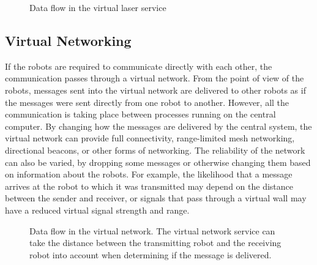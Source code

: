 \documentclass[]{article}
\begin{document}
\begin{figure}
	\centering
	\caption{Data flow in the virtual laser service}
\end{figure}

\subsection{Virtual Networking}

If the robots are required to communicate directly with each other, the communication passes through a virtual network.
From the point of view of the robots, messages sent into the virtual network are delivered to other robots as if the messages were sent directly from one robot to another. 
However, all the communication is taking place between processes running on the central computer.
By changing how the messages are delivered by the central system, the virtual network can provide full connectivity, range-limited mesh networking, directional beacons, or other forms of networking. 
The reliability of the network can also be varied, by dropping some messages or otherwise changing them based on information about the robots. 
For example, the likelihood that a message arrives at the robot to which it was transmitted may depend on the distance between the sender and receiver, or signals that pass through a virtual wall may have a reduced virtual signal strength and range.

\begin{figure}
	\centering
	\caption{Data flow in the virtual network. The virtual network service can take the distance between the transmitting robot and the receiving robot into account when determining if the message is delivered.}
\end{figure}
\end{document}
